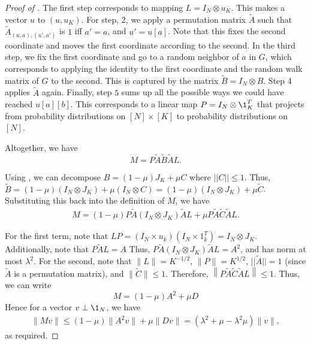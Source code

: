 \documentclass{article}
\begin{document}
\begin{proof}[Proof of ]
    The first step corresponds to mapping $L = I_N \otimes u_K$. This makes a vector $u$ to $(u, u_K)$. For step, 2, we apply a permutation matrix $\tilde{A}$ such that $\tilde{A}_{(u, a), (u', a')}$ is $1$ iff $a' = a$, and $u' = u[a]$. Note that this fixes the second coordinate and moves the first coordinate according to the second. In the third step, we fix the first coordinate and go to a random neighbor of $a$ in $G$, which corresponds to applying the identity to the first coordinate and the random walk matrix of $G$ to the second. This is captured by the matrix $\tilde{B} = I_N \otimes B$. Step 4  applies $\tilde{A}$ again. Finally, step $5$ sums up all the possible ways we could have reached $u[a][b]$. This corresponds to a linear map $P = I_N \otimes \1_K^T$ that projects from probability distributions on $[N] \times [K]$ to probability distributions on $[N]$.

    Altogether, we have $$M = P\tilde{A}\tilde{B}\tilde{A}L.$$

    Using , we can decompose $B = (1 - \mu)J_K + \mu C$ where $||C|| \leq 1$. Thus, $\tilde{B} = (1 - \mu)(I_N \otimes J_K) + \mu(I_N \otimes C) = (1 - \mu)(I_N \otimes J_K) + \mu\tilde{C}$. Substituting this back into the definition of $M$, we have 
    \begin{align*}
        M = (1 - \mu)P\tilde{A}(I_N \otimes J_K)\tilde{A}L + \mu P\tilde{A}\tilde{C}\tilde{A}L.
    \end{align*}


    For the first term, note that $LP = (I_N \times u_k) (I_N \times 1_k^T) = I_N \otimes J_K$. Additionally, note that $P\tilde{A}L = A$ Thus, $P\tilde{A}(I_N \otimes J_K)\tilde{A}L = A^2$, and has norm at most $\lambda^2$. For the second, note that $\|L\| = K^{-1/2}$, $\|P\| = K^{1/2}$, $||\tilde{A}|| = 1$ (since $\tilde{A}$ is a permutation matrix), and $\|\tilde{C}\| \leq 1$. Therefore, $\left\|P\tilde{A}\tilde{C}\tilde{A}L\right\| \leq 1$. Thus, we can write 
    $$
    M = (1 - \mu)A^2 + \mu D
    $$
    Hence for a vector $v \perp \1_N$, we have 
    \begin{align*}
        \|Mv\| \leq (1 - \mu)\|A^2v\| + \mu\|Dv\| = (\lambda^2 + \mu - \lambda^2\mu)\|v\|,
    \end{align*}
    as required.

\end{proof}
\end{document}
